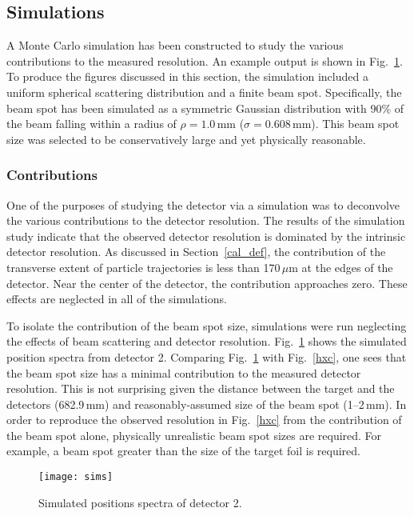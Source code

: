 \subsection{Simulations}
A Monte Carlo simulation has been constructed to study the various contributions to the measured resolution.  An example output is shown in Fig.~\ref{sims}. To produce the figures discussed in this section, the simulation included a uniform spherical scattering distribution and a finite beam spot.  Specifically, the beam spot has been simulated as a symmetric Gaussian distribution with 90\% of the beam falling within a radius of $\rho=1.0$\,mm ($\sigma = 0.608$\,mm). This beam spot size was selected to be conservatively large and yet physically reasonable.
\subsubsection{Contributions}
One of the purposes of studying the detector via a simulation was to deconvolve the various contributions to the detector resolution. The results of the simulation study indicate that the observed detector resolution is dominated by the intrinsic detector resolution.  As discussed in Section~\ref{cal_def}, the contribution of the transverse extent of particle trajectories is less than 170\,$\mu$m at the edges of the detector. Near the center of the detector, the contribution approaches zero. These effects are neglected in all of the simulations.

To isolate the contribution of the beam spot size, simulations were run neglecting the effects of beam scattering and detector resolution. Fig.~\ref{sims} shows the simulated position spectra from detector 2.  Comparing Fig.~\ref{sims} with Fig.~\ref{hxc}, one sees that the beam spot size has a minimal contribution to the measured detector resolution. This is not surprising given the distance between the target and the detectors (682.9\,mm) and reasonably-assumed size of the beam spot (1--2\,mm). In order to reproduce the observed resolution in Fig.~\ref{hxc} from the contribution of the beam spot alone, physically unrealistic beam spot sizes are required. For example, a beam spot greater than the size of the target foil is required.
\begin{figure}%
\texttt{[image: sims]}%
\caption{Simulated positions spectra of detector 2.}%
\label{sims}%
\end{figure}

